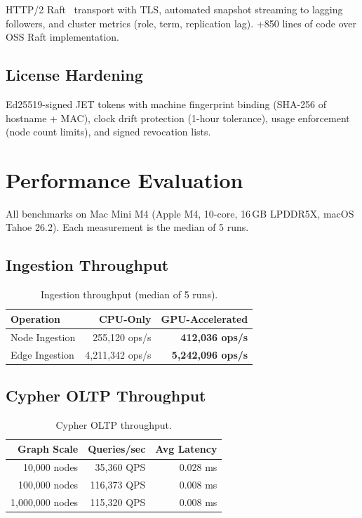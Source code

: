 \documentclass[11pt]{article}
\begin{document}
HTTP/2 Raft~\citep{ongaro2014raft} transport with TLS, automated snapshot streaming to lagging followers, and cluster metrics (role, term, replication lag). +850 lines of code over OSS Raft implementation.

\subsection{License Hardening}

Ed25519-signed JET tokens with machine fingerprint binding (SHA-256 of hostname + MAC), clock drift protection (1-hour tolerance), usage enforcement (node count limits), and signed revocation lists.

\section{Performance Evaluation}
\label{sec:eval}

All benchmarks on Mac Mini M4 (Apple M4, 10-core, 16\,GB LPDDR5X, macOS Tahoe 26.2). Each measurement is the median of 5 runs.

\subsection{Ingestion Throughput}

\begin{table}[H]
  \centering
  \caption{Ingestion throughput (median of 5 runs).}
  \label{tab:ingestion}
  \begin{tabular}{@{}lrr@{}}
    \toprule
    \textbf{Operation} & \textbf{CPU-Only} & \textbf{GPU-Accelerated} \\
    \midrule
    Node Ingestion & 255,120 ops/s & \textbf{412,036 ops/s} \\
    Edge Ingestion & 4,211,342 ops/s & \textbf{5,242,096 ops/s} \\
    \bottomrule
  \end{tabular}
\end{table}

\subsection{Cypher OLTP Throughput}

\begin{table}[H]
  \centering
  \caption{Cypher OLTP throughput.}
  \label{tab:oltp}
  \begin{tabular}{@{}rrr@{}}
    \toprule
    \textbf{Graph Scale} & \textbf{Queries/sec} & \textbf{Avg Latency} \\
    \midrule
    10,000 nodes    & 35,360 QPS  & 0.028 ms \\
    100,000 nodes   & 116,373 QPS & 0.008 ms \\
    1,000,000 nodes & 115,320 QPS & 0.008 ms \\
    \bottomrule
  \end{tabular}
\end{table}
\end{document}
